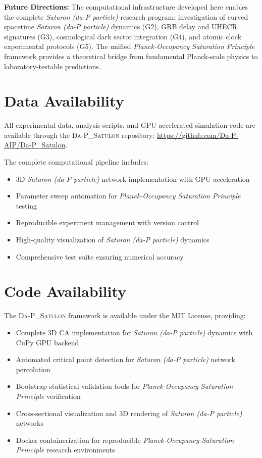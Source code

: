 \documentclass[twocolumn,showpacs,preprintnumbers,amsmath,amssymb,prb]{revtex4-2}
\newcommand{\satulon}{\textsc{Da-P\_Satulon}}
\newcommand{\saturon}{\textit{Saturon (da-P particle)}}
\newcommand{\posp}{\textit{Planck-Occupancy Saturation Principle}}
\begin{document}
\textbf{Future Directions:} The computational infrastructure developed here enables the complete \saturon{} research program: investigation of curved spacetime \saturon{} dynamics (G2), GRB delay and UHECR signatures (G3), cosmological dark sector integration (G4), and atomic clock experimental protocols (G5). The unified \posp{} framework provides a theoretical bridge from fundamental Planck-scale physics to laboratory-testable predictions.

\section*{Data Availability}

All experimental data, analysis scripts, and GPU-accelerated simulation code are available through the \satulon{} repository: \url{https://github.com/Da-P-AIP/Da-P_Satulon}. 

The complete computational pipeline includes:
\begin{itemize}
\item 3D \saturon{} network implementation with GPU acceleration
\item Parameter sweep automation for \posp{} testing
\item Reproducible experiment management with version control
\item High-quality visualization of \saturon{} dynamics
\item Comprehensive test suite ensuring numerical accuracy
\end{itemize}

\section*{Code Availability}

The \satulon{} framework is available under the MIT License, providing:
\begin{itemize}
\item Complete 3D CA implementation for \saturon{} dynamics with CuPy GPU backend
\item Automated critical point detection for \saturon{} network percolation
\item Bootstrap statistical validation tools for \posp{} verification
\item Cross-sectional visualization and 3D rendering of \saturon{} networks
\item Docker containerization for reproducible \posp{} research environments
\end{itemize}
\end{document}
